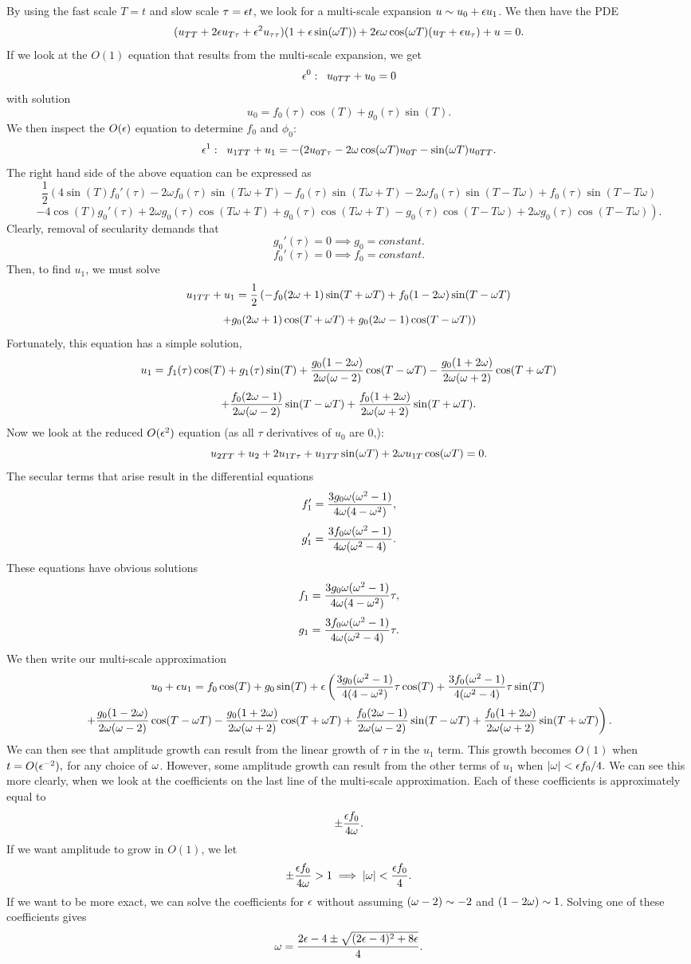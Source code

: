     By using the fast scale $T=t$ and slow scale $\tau=\epsilon t$, we look for a multi-scale expansion $u\sim u_0+\epsilon u_1$. We then have the PDE
    $$(u_{TT}+2\epsilon u_{T\tau}+\epsilon^2u_{\tau\tau})(1+\epsilon\sin(\omega T))+2\epsilon\omega\cos(\omega T)(u_T+\epsilon u_\tau)+u=0.$$
    If we look at the $O(1)$ equation that results from the multi-scale expansion, we get
    $$\epsilon^0:\;\; u_{0TT}+u_0=0$$
    with solution
    $$u_0=f_0(\tau)\cos(T)+g_0(\tau)\sin(T).$$
    We then inspect the $O(\epsilon)$ equation to determine $f_0$ and $\phi_0$:
    $$\epsilon^1:\;\; u_{1TT}+u_1=-(2u_{0T\tau}-2\omega\cos(\omega T)u_{0T}-\sin(\omega T)u_{0TT}.$$
    The right hand side of the above equation can be expressed as
    $$\frac{1}{2} \left(4 \sin (T) f_0'(\tau )-2 \omega  f_0(\tau ) \sin (T \omega +T)-f_0(\tau ) \sin (T \omega +T)-2 \omega  f_0(\tau ) \sin (T-T \omega )+f_0(\tau ) \sin (T-T \omega )\right.$$
    $$\left.-4 \cos (T) g_0'(\tau )+2 \omega  g_0(\tau ) \cos (T \omega +T)+g_0(\tau ) \cos (T \omega +T)-g_0(\tau ) \cos (T-T \omega )+2 \omega  g_0(\tau ) \cos (T-T \omega )\right).$$
    Clearly, removal of secularity demands that
    $$g_0'(\tau)=0\implies g_0=constant.$$
    $$f_0'(\tau)=0\implies f_0=constant.$$
    Then, to find $u_1$, we must solve
    $$u_{1TT}+u_1=\frac{1}{2} \left(-f_0(2\omega+1)\sin(T+\omega T)+f_0(1-2\omega)\sin(T-\omega T)\right.$$
    $$\left.+g_0(2\omega+1)\cos(T+\omega T)+g_0(2\omega-1)\cos(T-\omega T)\right)$$
    Fortunately, this equation has a simple solution,
    $$u_1=f_1(\tau)\cos(T)+g_1(\tau)\sin(T)+\frac{g_0(1-2\omega)}{2\omega(\omega-2)}\cos(T-\omega T)-\frac{g_0(1+2\omega)}{2\omega(\omega+2)}\cos(T+\omega T)$$
    $$+\frac{f_0(2\omega-1)}{2\omega(\omega-2)}\sin(T-\omega T)+\frac{f_0(1+2\omega)}{2\omega(\omega+2)}\sin(T+\omega T).$$
    Now we look at the reduced $O(\epsilon^2)$ equation (as all $\tau$ derivatives of $u_0$ are 0,):
    $$u_{2TT}+u_2+2u_{1T\tau}+u_{1TT}\sin(\omega T)+2\omega u_{1T}\cos(\omega T)=0.$$
    The secular terms that arise result in the differential equations
    $$f_1'=\frac{3g_0\omega(\omega^2-1)}{4\omega(4-\omega^2)},$$
    $$g_1'=\frac{3f_0\omega(\omega^2-1)}{4\omega(\omega^2-4)}.$$
    These equations have obvious solutions
    $$f_1=\frac{3g_0\omega(\omega^2-1)}{4\omega(4-\omega^2)}\tau,$$
    $$g_1=\frac{3f_0\omega(\omega^2-1)}{4\omega(\omega^2-4)}\tau.$$
    \pagebreak
    We then write our multi-scale approximation
    $$u_0+\epsilon u_1=f_0\cos(T)+g_0\sin(T)+\epsilon\left(\frac{3g_0(\omega^2-1)}{4(4-\omega^2)}\tau\cos(T)+\frac{3f_0(\omega^2-1)}{4(\omega^2-4)}\tau\sin(T)\right.$$
    $$\left.+\frac{g_0(1-2\omega)}{2\omega(\omega-2)}\cos(T-\omega T)-\frac{g_0(1+2\omega)}{2\omega(\omega+2)}\cos(T+\omega T) +\frac{f_0(2\omega-1)}{2\omega(\omega-2)}\sin(T-\omega T)+\frac{f_0(1+2\omega)}{2\omega(\omega+2)}\sin(T+\omega T)\right).$$
    We can then see that amplitude growth can result from the linear growth of $\tau$ in the $u_1$ term. This growth becomes $O(1)$ when $t=O(\epsilon^{-2}),$ for any choice of $\omega$. However, some amplitude growth can result from the other terms of $u_1$ when $|\omega|<\epsilon f_0/4.$ We can see this more clearly, when we look at the coefficients on the last line of the multi-scale approximation. Each of these coefficients is approximately equal to
    $$\pm\frac{\epsilon f_0}{4\omega}.$$
    If we want amplitude to grow in $O(1)$, we let
    $$\pm\frac{\epsilon f_0}{4\omega}>1\implies |\omega|<\frac{\epsilon f_0}{4}.$$
    If we want to be more exact, we can solve the coefficients for $\epsilon$ without assuming $(\omega-2)\sim - 2 $ and $(1-2\omega)\sim 1$. Solving one of these coefficients gives
    $$\omega=\frac{2\epsilon-4\pm\sqrt{(2\epsilon-4)^2+8\epsilon}}{4}.$$

